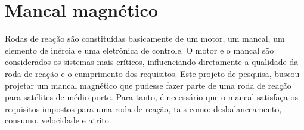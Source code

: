 \pagestyle{empty}
\cleardoublepage
\pagestyle{fancy}

\chapter{Mancal magnético}



Rodas de reação são constituídas basicamente de um motor, um mancal, um elemento de inércia e uma eletrônica de controle. O motor e o mancal são considerados os sistemas mais críticos, influenciando diretamente a qualidade da roda de reação e o cumprimento dos requisitos. Este projeto de pesquisa, buscou projetar um mancal magnético que pudesse fazer parte de uma roda de reação para satélites de médio porte. Para tanto, é necessário que o mancal satisfaça os requisitos impostos para uma roda de reação, tais como: desbalanceamento, consumo, velocidade e atrito.

